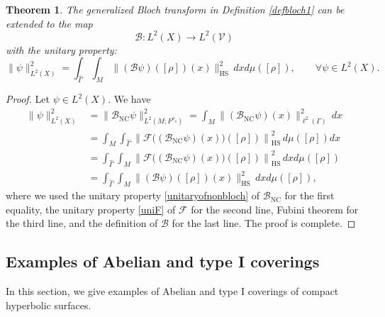 \documentclass[11pt,oneside,reqno]{amsart}
\newtheorem{theorem}{Theorem}[section]
\theoremstyle{definition}
\numberwithin{equation}{section}
\theoremstyle{plain}
\begin{document}
\begin{theorem}\label{thmunitB}
    The generalized Bloch transform in Definition \ref{defbloch1} can be extended to the map
    \begin{equation*}
        \mathcal{B}:L^2(X) \rightarrow L^2(\mathcal{V})
    \end{equation*}
   with the unitary property:
\begin{equation}\label{unitB}
       \| \psi\|_{L^2(X)}^2 = \int_{\widehat{\Gamma}} \int_M \big\|(\mathcal{B}\psi)([\rho]) (x) \big\|_{\mathrm{HS}}^2  \,dxd\mu([\rho]), \qquad \forall \psi \in L^2(X).
   \end{equation}
\end{theorem}
\begin{proof}
    Let $\psi \in L^2(X)$. We have
    \begin{equation*}
        \begin{aligned}
            \| \psi \|_{L^2(X)}^2 & = \| \mathcal{B}_{\mathrm{NC}}\psi \|_{L^2(M;F^{\rho_{\pi}})}^2 =  \int_M \| (\mathcal{B}_{\mathrm{NC}}\psi) (x)\|^2_{\ell^2(\Gamma)} \,dx \\
            &= \int_M \int_{\widehat{\Gamma}}  \left\| \mathcal{F}\Big( (\mathcal{B}_{\mathrm{NC}}\psi)(x) \Big) ([\rho])\right\|_{\mathrm{HS}}^2 \,d\mu([\rho])dx \\
            &= \int_{\widehat{\Gamma}} \int_M  \left\| \mathcal{F}\Big( (\mathcal{B}_{\mathrm{NC}}\psi)(x) \Big) ([\rho])\right\|_{\mathrm{HS}}^2 \,dxd\mu([\rho])\\
            &= \int_{\widehat{\Gamma}} \int_M \big\|(\mathcal{B}\psi)([\rho]) (x) \big\|_{\mathrm{HS}}^2  \,dxd\mu([\rho]),
        \end{aligned}
    \end{equation*}
where we used the unitary property \eqref{unitaryofnonbloch} of $\mathcal{B}_{\mathrm{NC}}$ for the first equality, the unitary property \eqref{uniF} of $\mathcal{F}$ for the second line, Fubini theorem for the third line, and the definition of $\mathcal{B}$ for the last line. The proof is complete.
\end{proof}

\subsection{Examples of Abelian and type I coverings}\label{sec:typeIcover}

In this section, we give examples of Abelian and type I coverings of compact hyperbolic surfaces. 
\end{document}
